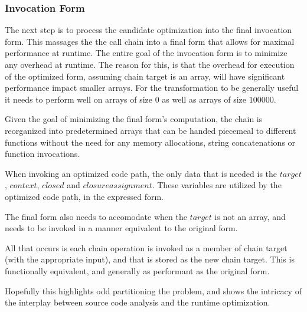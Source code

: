 \subsubsection{Invocation Form}
The next step is to process the candidate optimization into the final invocation form.  This massages the the call chain into a final form that allows for maximal performance at runtime.  The entire goal of the invocation form is to minimize any overhead at runtime.  The reason for this, is that the overhead for execution of the optimized form, assuming chain target is an array, will have significant performance impact smaller arrays.  For the transformation to be generally useful it needs to perform well on arrays of size $0$ as well as arrays of size $100000$.  

\begin{minipage}{\linewidth}

\end{minipage}

Given the goal of minimizing the final form's computation, the chain is reorganized into predetermined arrays that can be handed piecemeal to different functions without the need for any memory allocations, string concatenations or function invocations.

When invoking an optimized code path, the only data that is needed is the $target$, $context$, $closed$ and $closure assignment$.  These variables are utilized by the optimized code path, in the expressed form. 

The final form also needs to accomodate when the $target$ is not an array, and needs to be invoked in a manner equivalent to the original form.  

\begin{minipage}{\linewidth}

\end{minipage}

All that occurs is each chain operation is invoked as a member of chain target (with the appropriate input), and that is stored as the new chain target.  This is functionally equivalent, and generally as performant as the original form. %




Hopefully this highlights odd partitioning the problem, and shows the intricacy of the interplay between source code analysis and the runtime optimization.  